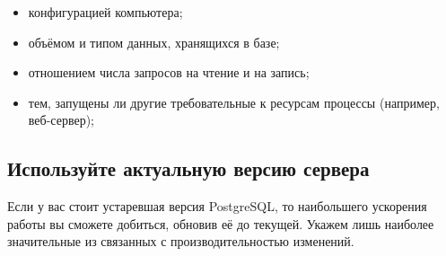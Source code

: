 \begin{itemize}
  \item конфигурацией компьютера;
  \item объёмом и типом данных, хранящихся в базе;
  \item отношением числа запросов на чтение и на запись;
  \item тем, запущены ли другие требовательные к ресурсам процессы (например, веб-сервер);
\end{itemize}


\subsection{Используйте актуальную версию сервера}

Если у вас стоит устаревшая версия PostgreSQL, то наибольшего ускорения работы вы сможете добиться, обновив её до текущей. Укажем лишь наиболее значительные из связанных с производительностью изменений.

